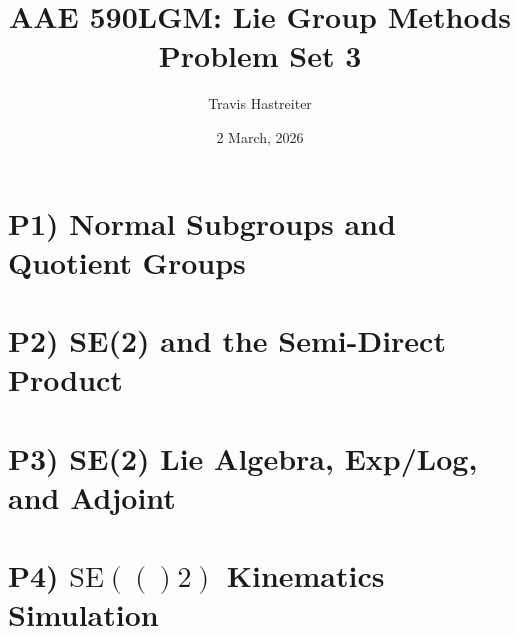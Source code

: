 \documentclass[titlepage]{article}
\title{\textbf{AAE 590LGM: Lie Group Methods} \\ Problem Set 3}
\author{Travis Hastreiter}
\date{2 March, 2026}
\newcommand{\SE}[1]{\text{SE}(#1)}
\numberwithin{equation}{section}
\begin{document}
\maketitle
\tableofcontents
\newpage
\lstlistoflistings
\newpage

\section{P1) Normal Subgroups and Quotient Groups}


\clearpage

\section{P2) SE(2) and the Semi-Direct Product}


\clearpage

\section{P3) SE(2) Lie Algebra, Exp/Log, and Adjoint}


\clearpage

\section{P4) $\SE(2)$ Kinematics Simulation}


\clearpage
\end{document}
